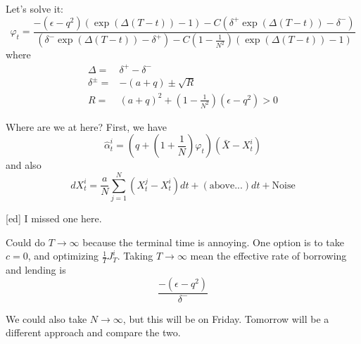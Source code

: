 Let's solve it:
\begin{equation}
	\varphi_t = \frac{-(\epsilon - q^2)(\exp(\Delta(T-t)) - 1) - C(\delta^+ \exp(\Delta(T-t)) - \delta^-)}
			 {(\delta^-\exp(\Delta(T-t)) - \delta^+ ) - C(1 - \frac{1}{N^2})(\exp(\Delta(T-t))-1)}
\end{equation}
where
\begin{align}
	\Delta =& \delta^+ - \delta^-\\
	\delta^\pm =& -(a+q) \pm \sqrt{R}\\
	R =& (a+q)^2 + (1 - \frac{1}{N^2})(\epsilon - q^2) > 0
\end{align}

Where are we at here? First, we have
\begin{equation}
	\hat{\alpha}_t^i = (q + (1 + \frac{1}{N})\varphi_t)(\bar{X} - X_t^i)
\end{equation}
and also
\begin{equation}
	dX^i_t = \frac{a}{N} \sum_{j=1}^N (X_t^j - X_t^i)dt + ( \text{above...} )dt + \text{Noise}
\end{equation}

[ed] I missed one here.

Could do $T\to \infty$ because the terminal time is annoying. One option is to take $c=0$, and optimizing $\frac{1}{T}J_T^i$. Taking $T\to\infty$ mean the effective rate of borrowing and lending is
\begin{equation}
	\frac{-(\epsilon - q^2)}{\delta^-}
\end{equation}

We could also take $N\to\infty$, but this will be on Friday. Tomorrow will be a different approach and compare the two.